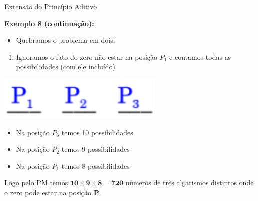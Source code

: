 \documentclass[aspectratio=169]{beamer}
\begin{document}
\begin{frame}{Extensão do Princípio Aditivo}

    \textbf{Exemplo 8 (continuação):}

\begin{itemize}
    \item Quebramos o problema em dois:
\end{itemize}

\begin{enumerate}
    \item Ignoramos o fato do zero não estar na posição $P_{1}$ e contamos todas as possibilidades (com ele incluído)
\end{enumerate}

\begin{center}
    \includegraphics[width=0.25\linewidth]{figs/3digitos3.png}
\end{center}

\begin{itemize}
    \item Na posição $P_{3}$ temos 10 possibilidades
    \item Na posição $P_{2}$ temos 9 possibilidades
    \item Na posição $P_{1}$ temos 8 possibilidades
\end{itemize}
\vspace{2mm}

Logo pelo PM temos $\boldsymbol{10 \times 9 \times 8 = 720}$ números de três algarismos distintos onde o zero pode estar na posição \textbf{P}.
\end{frame}
\end{document}
